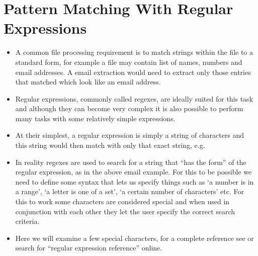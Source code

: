 \documentclass[letterpaper,10pt,english,openany]{sphinxmanual}
\begin{document}
\section{Pattern Matching With Regular Expressions}
\label{\detokenize{introduction_to_python/pattern_matching_with_regular_expressions:pattern-matching-with-regular-expressions}}\label{\detokenize{introduction_to_python/pattern_matching_with_regular_expressions:id1}}\label{\detokenize{introduction_to_python/pattern_matching_with_regular_expressions::doc}}\begin{itemize}
\item {} 
A common file processing requirement is to match strings within the
file to a standard form, for example a file may contain list of
names, numbers and email addresses. A email extraction would need to
extract only those entries that matched which look like an email
address.

\item {} 
Regular expressions, commonly called regexes, are ideally suited for
this task and although they can become very complex it is also
possible to perform many tasks with some relatively simple
expressions.

\item {} 
At their simplest, a regular expression is simply a string of
characters and this string would then match with only that exact
string, e.g.

\end{itemize}

\begin{sphinxVerbatim}[commandchars=\\\{\}]
   
  
\end{sphinxVerbatim}
\begin{itemize}
\item {} 
In reality regexes are used to search for a string that “has the
form” of the regular expression, as in the above email example. For
this to be possible we need to define some syntax that lets us
specify things such as ‘a number is in a range’, ‘a letter is one of
a set’, ‘a certain number of characters’ etc. For this to work some
characters are considered special and when used in conjunction with
each other they let the user specify the correct search criteria.

\item {} 
Here we will examine a few special characters, for a complete
reference see  or
search for “regular expression reference” online.

\end{itemize}
\end{document}
